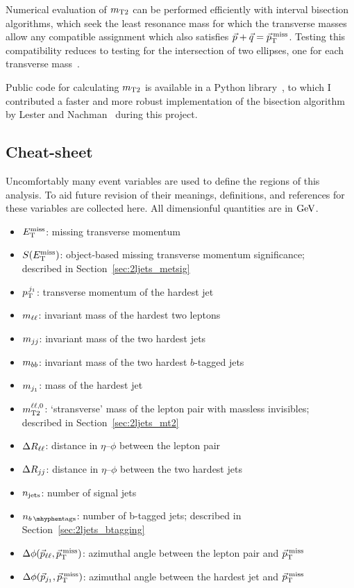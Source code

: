 Numerical evaluation of $\mttwo$ can be performed efficiently with interval
bisection algorithms, which seek the least resonance mass for which the
transverse masses allow any compatible assignment which also satisfies
$\vec p + \vec q = \ptmiss$.
Testing this compatibility reduces to testing for the intersection of two
ellipses, one for each transverse
mass~\cite{cheng2008minimal, lester2015bisection}.

Public code for calculating $\mttwo$ is available in a Python
library~\cite{gillam2021mt2}, to which I contributed a faster and more robust
implementation of the bisection algorithm by
Lester and Nachman~\cite{lester2015bisection} during this project.

\clearpage
\subsection{Cheat-sheet}
Uncomfortably many event variables are used to define the regions of this
analysis.
To aid future revision of their meanings, definitions, and references for these
variables are collected here.
All dimensionful quantities are in $\eV[G]$.
\begin{itemize}
\item $\met$: missing transverse momentum
\item $\metsig$: object-based missing transverse momentum significance;\\
described in Section~\ref{sec:2ljets_metsig}
\item $\ptjone$: transverse momentum of the hardest jet%
\vspace{0.5em}
\item $\mll$: invariant mass of the hardest two leptons
\item $\mjj$: invariant mass of the two hardest jets
\item $\mbb$: invariant mass of the two hardest $b$-tagged jets
\item $\mjetone$: mass of the hardest jet
\item $\mttwoll$: `stransverse' mass of the lepton pair with massless invisibles;\\
described in Section~\ref{sec:2ljets_mt2}
\vspace{0.5em}
\item $\rll$: distance in $\eta\textrm{--}\phi$ between the lepton pair
\item $\rjj$: distance in $\eta\textrm{--}\phi$ between the two hardest jets%
\vspace{0.5em}
\item $\njet$: number of signal jets
\item $\nbtag$: number of b-tagged jets;
described in Section~\ref{sec:2ljets_btagging}
\vspace{0.5em}
\item $\dphillmet$: azimuthal angle between the lepton pair and $\ptmiss$
\item $\dphijmet$: azimuthal angle between the hardest jet and $\ptmiss$
\end{itemize}
